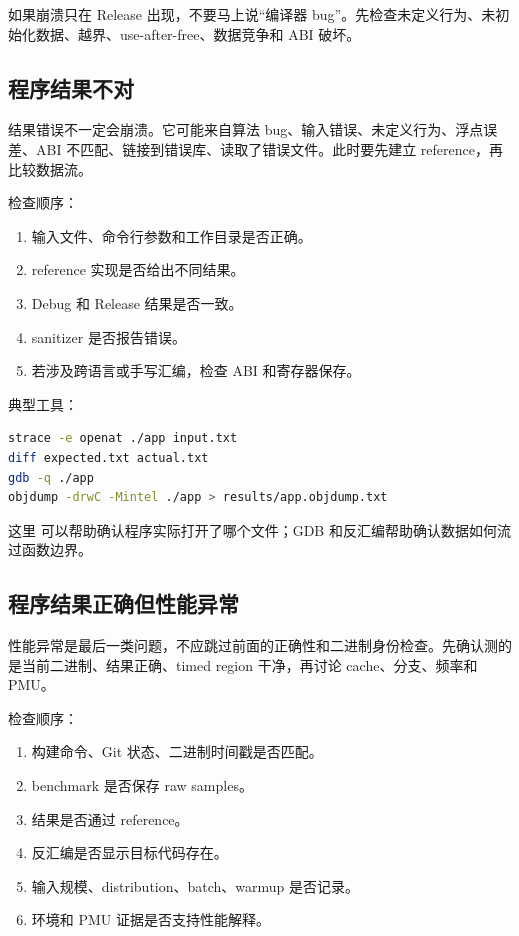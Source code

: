 如果崩溃只在 Release 出现，不要马上说“编译器 bug”。先检查未定义行为、未初始化数据、越界、use-after-free、数据竞争和 ABI 破坏。

\subsection{程序结果不对}

结果错误不一定会崩溃。它可能来自算法 bug、输入错误、未定义行为、浮点误差、ABI 不匹配、链接到错误库、读取了错误文件。此时要先建立 reference，再比较数据流。

检查顺序：

\begin{enumerate}
  \item 输入文件、命令行参数和工作目录是否正确。
  \item reference 实现是否给出不同结果。
  \item Debug 和 Release 结果是否一致。
  \item sanitizer 是否报告错误。
  \item 若涉及跨语言或手写汇编，检查 ABI 和寄存器保存。
\end{enumerate}

典型工具：

\begin{lstlisting}[language=bash]
strace -e openat ./app input.txt
diff expected.txt actual.txt
gdb -q ./app
objdump -drwC -Mintel ./app > results/app.objdump.txt
\end{lstlisting}

这里  可以帮助确认程序实际打开了哪个文件；GDB 和反汇编帮助确认数据如何流过函数边界。

\subsection{程序结果正确但性能异常}

性能异常是最后一类问题，不应跳过前面的正确性和二进制身份检查。先确认测的是当前二进制、结果正确、timed region 干净，再讨论 cache、分支、频率和 PMU。

检查顺序：

\begin{enumerate}
  \item 构建命令、Git 状态、二进制时间戳是否匹配。
  \item benchmark 是否保存 raw samples。
  \item 结果是否通过 reference。
  \item 反汇编是否显示目标代码存在。
  \item 输入规模、distribution、batch、warmup 是否记录。
  \item 环境和 PMU 证据是否支持性能解释。
\end{enumerate}

